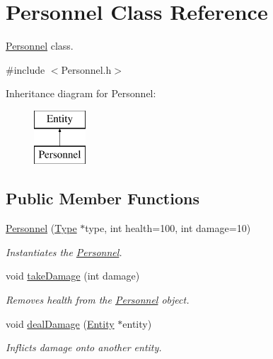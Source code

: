 \hypertarget{classPersonnel}{}\section{Personnel Class Reference}
\label{classPersonnel}


\hyperlink{classPersonnel}{Personnel} class.  




{\ttfamily \#include $<$Personnel.\+h$>$}

Inheritance diagram for Personnel\+:\begin{figure}[H]
\begin{center}
\leavevmode
\includegraphics[height=2.000000cm]{classPersonnel}
\end{center}
\end{figure}
\subsection*{Public Member Functions}
\begin{DoxyCompactItemize}
\item 
\hyperlink{classPersonnel_a8aa913af779660d0be7559164f92902d}{Personnel} (\hyperlink{classType}{Type} $\ast$type, int health=100, int damage=10)
\begin{DoxyCompactList}\small\item\em Instantiates the \hyperlink{classPersonnel}{Personnel}. \end{DoxyCompactList}\item 
void \hyperlink{classPersonnel_aeb670c84c0168f872346c55f7fc8383f}{take\+Damage} (int damage)
\begin{DoxyCompactList}\small\item\em Removes health from the \hyperlink{classPersonnel}{Personnel} object. \end{DoxyCompactList}\item 
void \hyperlink{classPersonnel_af688c3cc32f413b1d17fe423f25aa50b}{deal\+Damage} (\hyperlink{classEntity}{Entity} $\ast$entity)
\begin{DoxyCompactList}\small\item\em Inflicts damage onto another entity. \end{DoxyCompactList}\end{DoxyCompactItemize}


